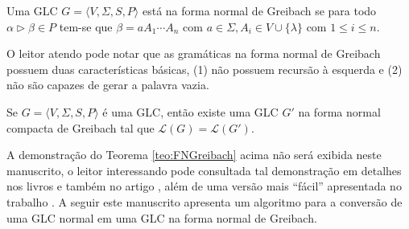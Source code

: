\begin{definition}
    Uma GLC $G = \langle V, \Sigma, S, P \rangle$ está na forma normal de Greibach se para todo $\alpha \rhd \beta \in P$ tem-se que $\beta = aA_1\cdots A_n$ com $a \in \Sigma, A_i \in V \cup \{\lambda\}$ com $1 \leq i \leq n$.
\end{definition}

O leitor atendo pode notar que as gramáticas na forma normal de Greibach possuem duas características básicas, (1) não possuem recursão à esquerda e (2) não são capazes de gerar a palavra vazia.

\begin{theorem}\label{teo:FNGreibach}
    Se $G = \langle V, \Sigma, S, P \rangle$ é uma GLC, então existe uma GLC $G'$ na forma normal compacta de Greibach tal que $\mathcal{L}(G) = \mathcal{L}(G')$.
\end{theorem}

A demonstração do Teorema \ref{teo:FNGreibach} acima não será exibida neste manuscrito, o leitor interessando pode consultada tal demonstração em detalhes nos livros \cite{benjaLivro2010, hopcroft2008} e também no artigo \cite{greibach1965}, além de uma versão mais ``fácil'' apresentada no trabalho \cite{andrzej1984}. A seguir este manuscrito apresenta um algoritmo para a conversão de uma GLC normal em uma GLC na forma normal de Greibach.

